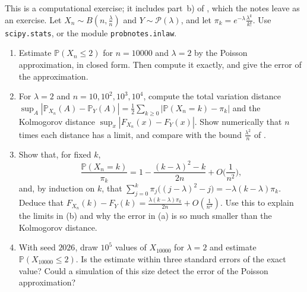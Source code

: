 \begin{exercise}\label{ex:cl-poisson-numerics}
\medium This is a computational exercise; it includes part~b) of
, which the notes leave as an exercise. Let
$X_n\sim B(n,\frac\lambda n)$ and $Y\sim\mathcal P(\lambda)$, and let $\pi_k=e^{-\lambda}\frac{\lambda^k}{k!}$.
Use \texttt{scipy.stats}, or the module \texttt{probnotes.inlaw}.
\begin{enumerate}[label=(\alph*)]
  \item Estimate $\mathbb P(X_n\le2)$ for $n=10000$ and $\lambda=2$ by the Poisson approximation,
    in closed form. Then compute it exactly, and give the error of the approximation.
  \item For $\lambda=2$ and $n=10,10^2,10^3,10^4$, compute the total variation distance
    $\sup_A|\mathbb P_{X_n}(A)-\mathbb P_Y(A)|=\frac12\sum_{k\ge0}|\mathbb P(X_n=k)-\pi_k|$ and the
    Kolmogorov distance $\sup_x|F_{X_n}(x)-F_Y(x)|$. Show numerically that $n$ times each distance
    has a limit, and compare with the bound $\frac{\lambda^2}n$ of .
  \item Show that, for fixed $k$,
    \[
      \frac{\mathbb P(X_n=k)}{\pi_k}=1-\frac{(k-\lambda)^2-k}{2n}+O\Big(\frac1{n^2}\Big),
    \]
    and, by induction on $k$, that $\sum_{j=0}^k\pi_j\big((j-\lambda)^2-j\big)=-\lambda(k-\lambda)\pi_k$.
    Deduce that $F_{X_n}(k)-F_Y(k)=\frac{\lambda(k-\lambda)\pi_k}{2n}+O(\frac1{n^2})$. Use this to
    explain the limits in (b) and why the error in (a) is so much smaller than the Kolmogorov
    distance.
  \item With seed $2026$, draw $10^5$ values of $X_{10000}$ for $\lambda=2$ and estimate
    $\mathbb P(X_{10000}\le2)$. Is the estimate within three standard errors of the exact value?
    Could a simulation of this size detect the error of the Poisson approximation?
\end{enumerate}
\end{exercise}

